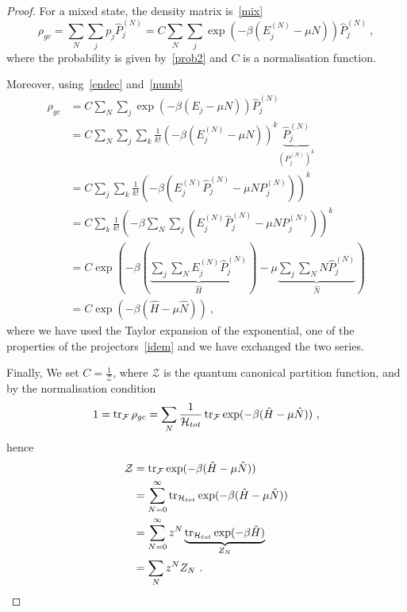     \begin{proof}
        For a mixed state, the density matrix is~\eqref{mix}
        \begin{equation*}
            \rho_{gc} = \sum_N \sum_j p_j \hat P_j^{(N)} = C \sum_N \sum_j \exp(- \beta (E_j^{(N)} - \mu N)) \hat P_j^{(N)} ~,
        \end{equation*}
        where the probability is given by~\eqref{prob2} and $C$ is a normalisation function.

        Moreover, using~\eqref{endec} and~\eqref{numb}
        \begin{equation*}
        \begin{aligned}
            \rho_{gc} & = C \sum_N \sum_j \exp(- \beta (E_j - \mu N)) \hat P_j^{(N)} \\ & = C \sum_N \sum_j \sum_k \frac{1}{k!} (-\beta (E_j^{(N)} - \mu N))^k \underbrace{\hat P_j^{(N)}}_{(P_j^{(N)})^k} \\ & = C \sum_j \sum_k \frac{1}{k!} (-\beta (E_j^{(N)} \hat P_j^{(N)} - \mu N P_j^{(N)}))^k \\ & = C \sum_k \frac{1}{k!} (-\beta \sum_N \sum_j (E_j^{(N)} \hat P_j^{(N)} - \mu N P_j^{(N)}))^k \\ & = C \exp(- \beta (\underbrace{\sum_j \sum_N E_j^{(N)} \hat P_j^{(N)}}_{\hat H}) - \mu \underbrace{\sum_j \sum_N N \hat P_j^{(N)}}_{\hat N}) \\ & = C \exp(- \beta (\hat H - \mu \hat N)) ~,
        \end{aligned}
        \end{equation*}
        where we have used the Taylor expansion of the exponential, one of the properties of the projectors~\eqref{idem} and we have exchanged the two series.

        Finally, We set $C = \frac{1}{\mathcal Z}$, where $\mathcal Z$ is the quantum canonical partition function, and by the normalisation condition 
        \begin{equation*}
            1 = \operatorname{tr}_{\mathcal F} \rho_{gc} = \sum_N \frac{1}{\mathcal H_{tot}} \operatorname{tr}_{\mathcal F} \exp(- \beta (\hat H - \mu \hat N)) ~,
        \end{equation*}
        hence 
        \begin{equation*}
        \begin{aligned}
            \mathcal Z & = \operatorname{tr}_{\mathcal F} \exp(- \beta (\hat H - \mu \hat N)) \\ & = \sum_{N=0}^{\infty} \operatorname{tr}_{\mathcal H_{tot}} \exp(- \beta (\hat H - \mu \hat N)) \\ & = \sum_{N=0}^{\infty} z^N \underbrace{\operatorname{tr}_{\mathcal H_{tot}} \exp(- \beta \hat H)}_{Z_N} \\ & = \sum_N z^N Z_N ~.
        \end{aligned}
        \end{equation*}
    \end{proof}

